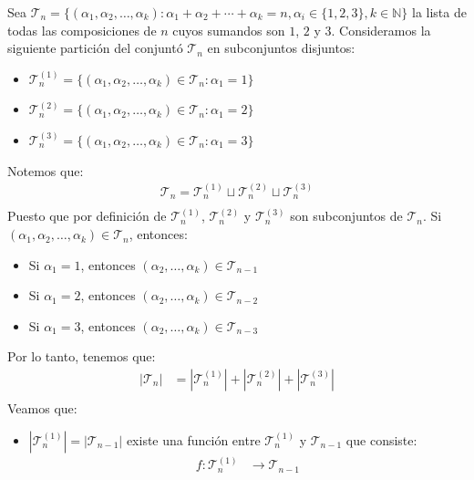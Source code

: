 \begin{solucion}
  Sea $\mathcal T_n =\{
    (\alpha_1,\alpha_2,\ldots,\alpha_k): \alpha_1+\alpha_2+\cdots+\alpha_k=n, \alpha_i\in\{1,2,3\}, k\in \mathbb N\}$ la lista de todas las composiciones de \(n\) cuyos sumandos son \(1\), \(2\) y \(3\). Consideramos la siguiente partición del conjuntó \(\mathcal T_n\) en subconjuntos disjuntos:
    \begin{itemize}
        \item \(\mathcal T_n^{(1)} = \{(\alpha_1,\alpha_2,\ldots,\alpha_k)\in \mathcal T_n: \alpha_1=1\}\)
        \item \(\mathcal T_n^{(2)} = \{(\alpha_1,\alpha_2,\ldots,\alpha_k)\in \mathcal T_n: \alpha_1=2\}\)
        \item \(\mathcal T_n^{(3)} = \{(\alpha_1,\alpha_2,\ldots,\alpha_k)\in \mathcal T_n: \alpha_1=3\}\)
    \end{itemize}
    Notemos que:
    \begin{align*}
        \mathcal T_n = \mathcal T_n^{(1)} \sqcup \mathcal T_n^{(2)} \sqcup \mathcal T_n^{(3)} \\
    \end{align*}
    Puesto que por definición de $\mathcal T_n^{(1)}$, $\mathcal T_n^{(2)}$ y $\mathcal T_n^{(3)}$ son subconjuntos de \(\mathcal T_n\). Si $(\alpha_1,\alpha_2,\ldots,\alpha_k)\in \mathcal T_n$, entonces:
    \begin{itemize}
        \item Si \(\alpha_1=1\), entonces \((\alpha_2,\ldots,\alpha_k)\in \mathcal T_{n-1}\)
        \item Si \(\alpha_1=2\), entonces \((\alpha_2,\ldots,\alpha_k)\in \mathcal T_{n-2}\)
        \item Si \(\alpha_1=3\), entonces \((\alpha_2,\ldots,\alpha_k)\in \mathcal T_{n-3}\)
    \end{itemize}
    Por lo tanto, tenemos que:
    \begin{align*}
        |\mathcal T_n| &= |\mathcal T_n^{(1)}| + |\mathcal T_n^{(2)}| + |\mathcal T_n^{(3)}| \\
    \end{align*}
    Veamos que:
    \begin{itemize}
        \item $|\mathcal T_n^{(1)}| = |\mathcal T_{n-1}|$ existe una función entre \(\mathcal T_n^{(1)}\) y \(\mathcal T_{n-1}\) que consiste:
        \begin{align*}
            f: \mathcal T_n^{(1)} &\to \mathcal T_{n-1} \\

\end{align*}
\end{itemize}
\end{solucion}
